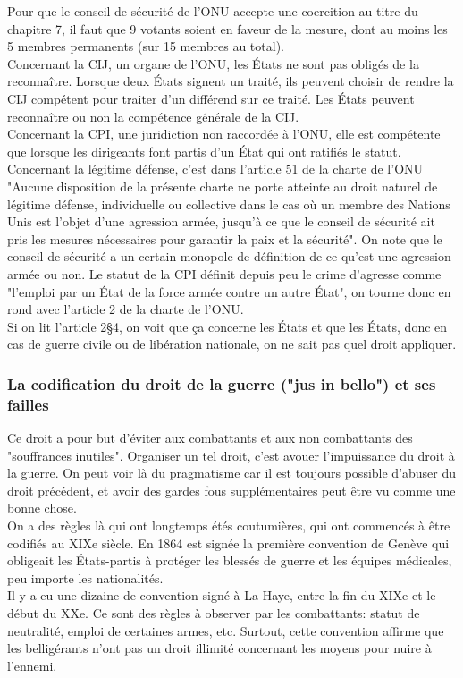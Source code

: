 \documentclass[10pt, a4paper, openany]{book}
\begin{document}
Pour que le conseil de sécurité de l'ONU accepte une coercition au titre du chapitre 7, il faut que 9 votants soient en faveur de la mesure, dont au moins les 5 membres permanents (sur 15 membres au total). \\
Concernant la CIJ, un organe de l'ONU, les États ne sont pas obligés de la reconnaître. Lorsque deux États signent un traité, ils peuvent choisir de rendre la CIJ compétent pour traiter d'un différend sur ce traité. Les États peuvent reconnaître ou non la compétence générale de la CIJ. \\
Concernant la CPI, une juridiction non raccordée à l'ONU, elle est compétente que lorsque les dirigeants font partis d'un État qui ont ratifiés le statut. \\
Concernant la légitime défense, c'est dans l'article 51 de la charte de l'ONU "Aucune disposition de la présente charte ne porte atteinte au droit naturel de légitime défense, individuelle ou collective dans le cas où un membre des Nations Unis est l'objet d'une agression armée, jusqu'à ce que le conseil de sécurité ait pris les mesures nécessaires pour garantir la paix et la sécurité". On note que le conseil de sécurité a un certain monopole de définition de ce qu'est une agression armée ou non. Le statut de la CPI définit depuis peu le crime d'agresse comme "l'emploi par un État de la force armée contre un autre État", on tourne donc en rond avec l'article 2 de la charte de l'ONU. \\
Si on lit l'article 2§4, on voit que ça concerne les États et que les États, donc en cas de guerre civile ou de libération nationale, on ne sait pas quel droit appliquer. 


\subsubsection{La codification du droit de la guerre ("jus in bello") et ses failles}

Ce droit a pour but d'éviter aux combattants et aux non combattants des "souffrances inutiles". Organiser un tel droit, c'est avouer l'impuissance du droit à la guerre. On peut voir là du pragmatisme car il est toujours possible d'abuser du droit précédent, et avoir des gardes fous supplémentaires peut être vu comme une bonne chose. \\
On a des règles là qui ont longtemps étés coutumières, qui ont commencés à être codifiés au XIXe siècle. En 1864 est signée la première convention de Genève qui obligeait les États-partis à protéger les blessés de guerre et les équipes médicales, peu importe les nationalités. \\
Il y a eu une dizaine de convention signé à La Haye, entre la fin du XIXe et le début du XXe. Ce sont des règles à observer par les combattants: statut de neutralité, emploi de certaines armes, etc. Surtout, cette convention affirme que les belligérants n'ont pas un droit illimité concernant les moyens pour nuire à l'ennemi.
\end{document}
